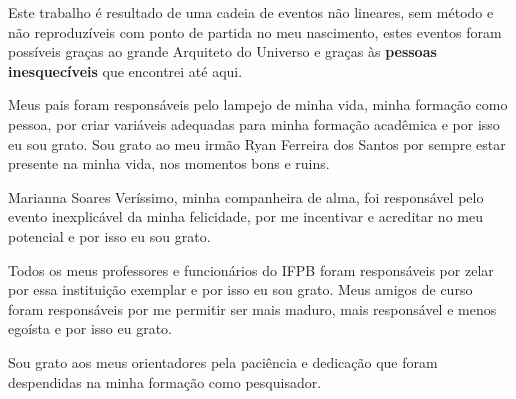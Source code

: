 \begin{agradecimentos}
Este trabalho é resultado de uma cadeia de eventos não lineares, sem método e não reproduzíveis com ponto de partida no meu nascimento, estes eventos foram possíveis graças ao grande Arquiteto do Universo e graças às \textbf{pessoas inesquecíveis} que encontrei até aqui.

Meus pais foram responsáveis pelo lampejo de minha vida, minha formação como pessoa, por criar variáveis adequadas para minha formação acadêmica e por isso eu sou grato. Sou grato ao meu irmão Ryan Ferreira dos Santos por sempre estar presente na minha vida, nos momentos bons e ruins.

Marianna Soares Veríssimo, minha companheira de alma, foi responsável pelo evento inexplicável da minha felicidade, por me incentivar e acreditar no meu potencial e por isso eu sou grato.

Todos os meus professores e funcionários do IFPB foram responsáveis por zelar por essa instituição exemplar e por isso eu sou grato. Meus amigos de curso foram responsáveis por me permitir ser mais maduro, mais responsável e menos egoísta e por isso eu grato.

Sou grato aos meus orientadores pela paciência e dedicação que foram despendidas na minha formação como pesquisador.
\end{agradecimentos}